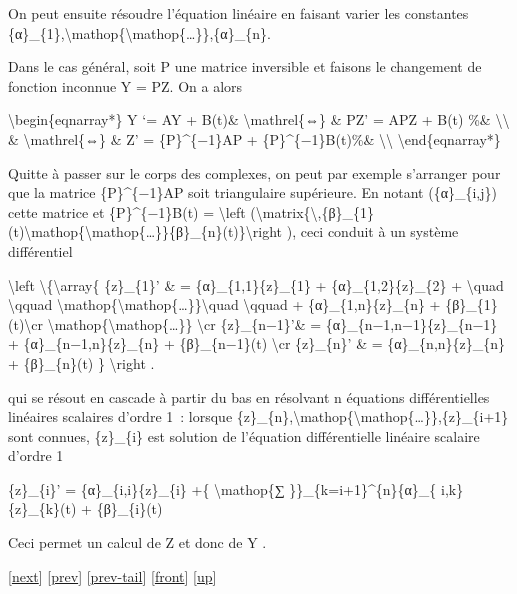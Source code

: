\documentclass[]{article}
\begin{document}
On peut ensuite résoudre l'équation linéaire en faisant varier les
constantes
\{α\}\_\{1\},\textbackslash{}mathop\{\textbackslash{}mathop\{\ldots{}\}\},\{α\}\_\{n\}.

Dans le cas général, soit P une matrice inversible et faisons le
changement de fonction inconnue Y = PZ. On a alors

\textbackslash{}begin\{eqnarray*\} Y `= AY + B(t)\&
\textbackslash{}mathrel\{⇔\} \& PZ' = APZ + B(t) \%\&
\textbackslash{}\textbackslash{} \& \textbackslash{}mathrel\{⇔\} \& Z' =
\{P\}\^{}\{−1\}AP + \{P\}\^{}\{−1\}B(t)\%\&
\textbackslash{}\textbackslash{} \textbackslash{}end\{eqnarray*\}

Quitte à passer sur le corps des complexes, on peut par exemple
s'arranger pour que la matrice \{P\}\^{}\{−1\}AP soit triangulaire
supérieure. En notant (\{α\}\_\{i,j\}) cette matrice et
\{P\}\^{}\{−1\}B(t) = \textbackslash{}left
(\textbackslash{}matrix\{\textbackslash{},\{β\}\_\{1\}(t)\textbackslash{}mathop\{\textbackslash{}mathop\{\ldots{}\}\}\{β\}\_\{n\}(t)\}\textbackslash{}right
), ceci conduit à un système différentiel

\textbackslash{}left \textbackslash{}\{\textbackslash{}array\{
\{z\}\_\{1\}' \& = \{α\}\_\{1,1\}\{z\}\_\{1\} +
\{α\}\_\{1,2\}\{z\}\_\{2\} + \textbackslash{}quad \textbackslash{}qquad
\textbackslash{}mathop\{\textbackslash{}mathop\{\ldots{}\}\}\textbackslash{}quad
\textbackslash{}qquad + \{α\}\_\{1,n\}\{z\}\_\{n\} +
\{β\}\_\{1\}(t)\textbackslash{}cr
\textbackslash{}mathop\{\textbackslash{}mathop\{\ldots{}\}\}
\textbackslash{}cr \{z\}\_\{n−1\}'\& = \{α\}\_\{n−1,n−1\}\{z\}\_\{n−1\}
+ \{α\}\_\{n−1,n\}\{z\}\_\{n\} + \{β\}\_\{n−1\}(t) \textbackslash{}cr
\{z\}\_\{n\}' \& = \{α\}\_\{n,n\}\{z\}\_\{n\} + \{β\}\_\{n\}(t) \}
\textbackslash{}right .

qui se résout en cascade à partir du bas en résolvant n équations
différentielles linéaires scalaires d'ordre 1~: lorsque
\{z\}\_\{n\},\textbackslash{}mathop\{\textbackslash{}mathop\{\ldots{}\}\},\{z\}\_\{i+1\}
sont connues, \{z\}\_\{i\} est solution de l'équation différentielle
linéaire scalaire d'ordre 1

\{z\}\_\{i\}' = \{α\}\_\{i,i\}\{z\}\_\{i\} +\{ \textbackslash{}mathop\{∑
\}\}\_\{k=i+1\}\^{}\{n\}\{α\}\_\{ i,k\}\{z\}\_\{k\}(t) + \{β\}\_\{i\}(t)

Ceci permet un calcul de Z et donc de Y .

{[}\href{coursse89.html}{next}{]} {[}\href{coursse87.html}{prev}{]}
{[}\href{coursse87.html\#tailcoursse87.html}{prev-tail}{]}
{[}\href{coursse88.html}{front}{]}
{[}\href{coursch17.html\#coursse88.html}{up}{]}
\end{document}
